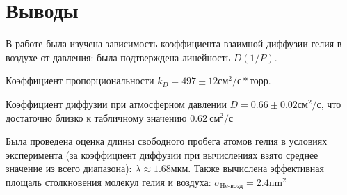 \documentclass[a4paper,12pt]{article}
\begin{document}
\section{Выводы}
\par В работе была изучена зависимость коэффициента взаимной диффузии гелия в воздухе от давления: была подтверждена линейность $D(1/P)$. \newline

Коэффициент пропорциональности $k_D = 497 \pm 12\text{см}^2/\text{с}*\text{торр}$.\newline
\par Коэффициент диффузии при атмосферном давлении $D = 0.66 \pm 0.02 \text{см} ^2/\text{с} $, что достаточно близко к табличному значению $0.62 \ \text{см} ^2/\text{с} $

\par Была проведена оценка длины свободного пробега атомов гелия в условиях эксперимента (за коэффициент диффузии при вычислениях взято среднее значение из всего диапазона): $\lambda \approx 1.68 \text{мкм}$.
Также вычислена эффективная площаль столкновения молекул гелия и воздуха: $\sigma_{\text{He-возд}} = 2.4 \text{nm}^2$
\end{document}
